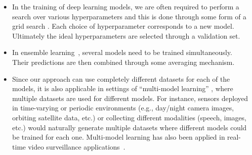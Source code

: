 \begin{itemize}
    \item In the training of deep learning models, we are often required to perform a search over various hyperparameters and this is done through some form of a grid search \cite{bergstra2011algorithms}. Each choice of hyperparameter corresponds to a new model. Ultimately the ideal hyperparameters are selected through a validation set. 
    
    \item In ensemble learning~\cite{zhou2012ensemble}, several models need to be trained simultaneously. Their predictions are then combined through some averaging mechanism.
    
    \item Since our approach can use completely different datasets for each of the models, it is also applicable in settings of “multi-model learning” \cite{bhuyan2022multi, da2022multichannel}, where multiple datasets are used for different models. For instance, sensors deployed in time-varying or periodic environments (e.g., day/night camera images, orbiting satellite data, etc.) or collecting different modalities (speech, images, etc.) would naturally generate multiple datasets where different models could be trained for each one.  Multi-model learning has also been applied in real-time video surveillance applications~\cite{wu2021parallel}. 
\end{itemize}




    




